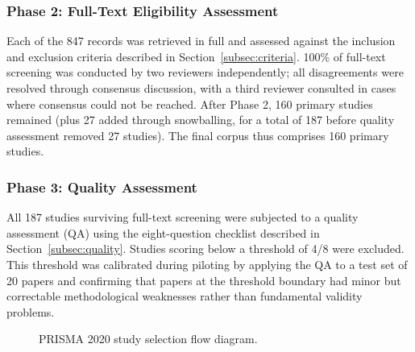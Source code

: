 \subsubsection{Phase 2: Full-Text Eligibility Assessment}

Each of the 847 records was retrieved in full and assessed against the inclusion and exclusion
criteria described in Section~\ref{subsec:criteria}. 100\% of full-text screening was conducted
by two reviewers independently; all disagreements were resolved through consensus discussion,
with a third reviewer consulted in cases where consensus could not be reached. After Phase 2,
160 primary studies remained (plus 27 added through snowballing, for a total of 187 before
quality assessment removed 27 studies). The final corpus thus comprises 160 primary studies.

\subsubsection{Phase 3: Quality Assessment}

All 187 studies surviving full-text screening were subjected to a quality assessment (QA) using
the eight-question checklist described in Section~\ref{subsec:quality}. Studies scoring below
a threshold of 4/8 were excluded. This threshold was calibrated during piloting by applying the
QA to a test set of 20 papers and confirming that papers at the threshold boundary had minor
but correctable methodological weaknesses rather than fundamental validity problems.

\begin{figure}[h]
\centering
{}
\caption{PRISMA 2020 study selection flow diagram.}
\label{fig:prisma}
\end{figure}

